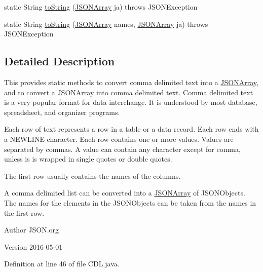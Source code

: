 \begin{DoxyCompactItemize}
\item 
static String \hyperlink{classorg_1_1json_1_1CDL_a4a90929f59ce156378c84830d5f341ad}{to\-String} (\hyperlink{classorg_1_1json_1_1JSONArray}{J\-S\-O\-N\-Array} ja)  throws J\-S\-O\-N\-Exception 
\item 
static String \hyperlink{classorg_1_1json_1_1CDL_a85fc54efa24cb7dad1f615b1d659772f}{to\-String} (\hyperlink{classorg_1_1json_1_1JSONArray}{J\-S\-O\-N\-Array} names, \hyperlink{classorg_1_1json_1_1JSONArray}{J\-S\-O\-N\-Array} ja)  throws J\-S\-O\-N\-Exception 
\end{DoxyCompactItemize}


\subsection{Detailed Description}
This provides static methods to convert comma delimited text into a \hyperlink{classorg_1_1json_1_1JSONArray}{J\-S\-O\-N\-Array}, and to convert a \hyperlink{classorg_1_1json_1_1JSONArray}{J\-S\-O\-N\-Array} into comma delimited text. Comma delimited text is a very popular format for data interchange. It is understood by most database, spreadsheet, and organizer programs. 

Each row of text represents a row in a table or a data record. Each row ends with a N\-E\-W\-L\-I\-N\-E character. Each row contains one or more values. Values are separated by commas. A value can contain any character except for comma, unless is is wrapped in single quotes or double quotes. 

The first row usually contains the names of the columns. 

A comma delimited list can be converted into a \hyperlink{classorg_1_1json_1_1JSONArray}{J\-S\-O\-N\-Array} of J\-S\-O\-N\-Objects. The names for the elements in the J\-S\-O\-N\-Objects can be taken from the names in the first row. \begin{DoxyAuthor}{Author}
J\-S\-O\-N.\-org 
\end{DoxyAuthor}
\begin{DoxyVersion}{Version}
2016-\/05-\/01 
\end{DoxyVersion}


Definition at line 46 of file C\-D\-L.\-java.



